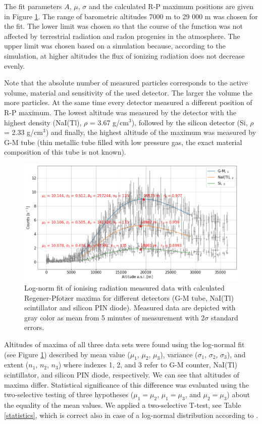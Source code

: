 \documentclass{Rpd}
\begin{document}
The fit parameters $A$, $\mu$, $\sigma$ and the calculated R-P maximum positions are given in Figure \ref{R-P_maximum}. The range of barometric altitudes 7000 m to 29 000 m was chosen for the fit. The lower limit was chosen so that the course of the function was not affected by terrestrial radiation and radon progenies in the atmosphere. The upper limit was chosen based on a simulation because, according to the simulation, at higher altitudes the flux of ionizing radiation does not decrease evenly. 

Note that the absolute number of measured particles corresponds to the active volume, material and sensitivity of the used detector. The larger the volume the more particles. At the same time every detector measured a different position of R-P maximum. The lowest altitude was measured by the detector with the highest density (NaI(Tl), $\rho$ = 3.67 g/cm$^3$), followed by the silicon detector (Si, $\rho$ = 2.33 g/cm$^3$) and finally, the highest altitude of the maximum was measured by G-M tube (thin metallic tube filled with low pressure gas, the exact material composition of this tube is not known).

\begin{figure}
	\centerline{\includegraphics[width=\columnwidth]{img/FIK-6_R-P_maximum.png}}
	\caption{Log-norm fit of ionising radiation measured data with calculated Regener-Pfotzer maxima for different detectors (G-M tube, NaI(Tl) scintillator and silicon PIN diode). Measured data are depicted with gray color as mean from 5 minutes of measurement with 2$\sigma$ standard errors. \label{R-P_maximum}}
\end{figure}

Altitudes of maxima of all three data sets were found using the log-normal fit (see Figure \ref{R-P_maximum}) described by mean value ($\mu_1$, $\mu_2$, $\mu_3$), variance ($\sigma_1$, $\sigma_2$, $\sigma_3$), and extent ($n_1$, $n_2$, $n_3$) where indexes 1, 2, and 3 refer to G-M counter, NaI(Tl) scintillator, and silicon PIN diode, respectively. We can see that altitudes of maxima differ. Statistical significance of this difference was evaluated using the two-selective testing of three hypotheses ($\mu_1 = \mu_2$, $\mu_1 = \mu_3$, and $\mu_2 = \mu_3$) about the equality of the mean values. We applied a two-selective T-test, see Table \ref{statistics}, which is correct also in case of a log-normal distribution according to \cite{confidence_intervals}.
\end{document}
